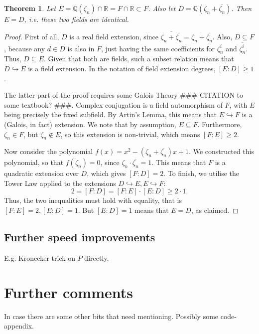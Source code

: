 \documentclass[11pt]{article}
\newtheorem{theorem}{Theorem}[section]
\begin{document}
\begin{theorem}
  Let $E = \mathbb{Q}(\zeta_n) \cap \mathbb{R} = F \cap \mathbb{R} \subset F$.
  Also let $D = \mathbb{Q}(\zeta_n + \overline{\zeta_n})$.
  Then $E = D$, i.e. these two fields are identical.
\end{theorem}
\begin{proof}
  First of all, $D$ is a real field extension, since $\overline{\zeta_n + \overline{\zeta_n}} = \zeta_n + \overline{\zeta_n}$.
  Also, $D \subseteq F$, because any $d \in D$ is also in $F$, just having the same coefficients for $\zeta_n^i$ and $\overline{\zeta_n^i}$.
  Thus, $D \subseteq E$. Given that both are fields, such a subset relation means that $D \hookrightarrow E$ is a field extension.
  In the notation of field extension degrees, $[E:D] \geq 1$.

  The latter part of the proof requires some Galois Theory \#\#\# CITATION to some textbook? \#\#\#.
  Complex conjugation is a field automorphism of $F$, with $E$ being precisely the fixed subfield.
  By Artin's Lemma, this means that $E \hookrightarrow F$ is a (Galois, in fact) extension.
  We note that by assumption, $E \subseteq F$. Furthermore, $\zeta_n \in F$, but $\zeta_n \notin E$,
  so this extension is non-trivial, which means $[F:E] \geq 2$.

  Now consider the polynomial $f(x) = x^2 - (\zeta_n + \overline{\zeta_n})x + 1$. We constructed this
  polynomial, so that $f(\zeta_n) = 0$, since $\zeta_n \cdot \overline{\zeta_n} = 1$. This means
  that $F$ is a quadratic extension over $D$, which gives $[F:D] = 2$. To finish, we utilise the Tower Law
  applied to the extensions $D \hookrightarrow E, E \hookrightarrow F$:
  \[2 = [F:D] = [F:E] \cdot [E:D] \geq 2 \cdot 1.\]
  Thus, the two inequalities must hold with equality, that is $[F:E] = 2, [E:D] = 1$.
  But $[E:D] = 1$ means that $E = D$, as claimed.
\end{proof}

\subsection{Further speed improvements}

E.g. Kronecker trick on $P$ directly.

\section{Further comments}

In case there are some other bits that need mentioning. Possibly some code-appendix.

\printbibliography[title={References}]
%
%
\end{document}

